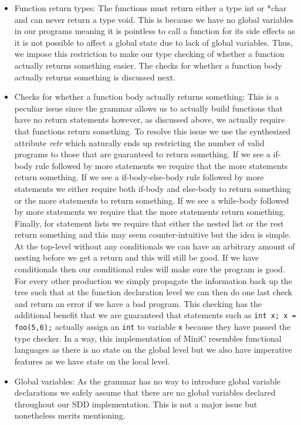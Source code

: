 \documentclass{article}
\begin{document}
\begin{itemize}
    \item Function return types: The functions must return either a type int or *char and can never return a type void. This is because we have no global variables in our programs meaning it is pointless to call a function for its side effects as it is not possible to affect a global state due to lack of global variables. Thus, we impose this restriction to make our type checking of whether a function actually returns something easier. The checks for whether a function body actually returns something is discussed next.
    \item Checks for whether a function body actually returns something: This is a peculiar issue since the grammar allows us to actually build functions that have no return statements however, as discussed above, we actually require that functions return something. To resolve this issue we use the synthesized attribute \textit{retr} which naturally ends up restricting the number of valid programs to those that are guaranteed to return something. If we see a if-body rule followed by more statements we require that the more statements return something. If we see a if-body-else-body rule followed by more statements we either require both if-body and else-body to return something or the more statements to return something. If we see a while-body followed by more statements we require that the more statements return something. Finally, for statement lists we require that either the nested list or the rest return something and this may seem counter-intuitive but the idea is simple. At the top-level without any conditionals we can have an arbitrary amount of nesting before we get a return and this will still be good. If we have conditionals then our conditional rules will make sure the program is good. For every other production we simply propagate the information back up the tree such that at the function declaration level we can then do one last check and return an error if we have a bad program. This checking has the additional benefit that we are guaranteed that statements such as \texttt{int x; x = foo(5,6);} actually assign an \texttt{int} to variable \texttt{x} because they have passed the type checker. In a way, this implementation of MiniC resembles functional languages as there is no state on the global level but we also have imperative features as we have state on the local level.
    \item Global variables: As the grammar has no way to introduce global variable declarations we safely assume that there are no global variables declared throughout our SDD implementation. This is not  a major issue but nonetheless merits mentioning.

\end{itemize}
\end{document}
